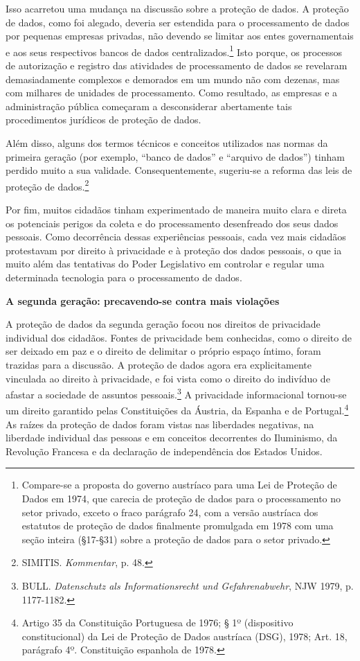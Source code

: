 Isso acarretou uma mudança na discussão sobre a proteção de dados. A
proteção de dados, como foi alegado, deveria ser estendida para o
processamento de dados por pequenas empresas privadas, não devendo se
limitar aos entes governamentais e aos seus respectivos bancos de dados
centralizados.\footnote{Compare-se a proposta do governo austríaco para
  uma Lei de Proteção de Dados em 1974, que carecia de proteção de dados
  para o processamento no setor privado, exceto o fraco parágrafo 24,
  com a versão austríaca dos estatutos de proteção de dados finalmente
  promulgada em 1978 com uma seção inteira (§17-§31) sobre a proteção de
  dados para o setor privado.} Isto porque, os processos de autorização
e registro das atividades de processamento de dados se revelaram
demasiadamente complexos e demorados em um mundo não com dezenas, mas
com milhares de unidades de processamento. Como resultado, as empresas e
a administração pública começaram a desconsiderar abertamente tais
procedimentos jurídicos de proteção de dados.

Além disso, alguns dos termos técnicos e conceitos utilizados nas normas
da primeira geração (por exemplo, ``banco de dados'' e ``arquivo de
dados'') tinham perdido muito a sua validade. Consequentemente,
sugeriu-se a reforma das leis de proteção de dados.\footnote{SIMITIS.
  \emph{Kommentar}, p. 48.}

Por fim, muitos cidadãos tinham experimentado de maneira muito clara e
direta os potenciais perigos da coleta e do processamento desenfreado
dos seus dados pessoais. Como decorrência dessas experiências pessoais,
cada vez mais cidadãos protestavam por direito à privacidade e à
proteção dos dados pessoais, o que ia muito além das tentativas do Poder
Legislativo em controlar e regular uma determinada tecnologia para o
processamento de dados.

\textbf{A segunda geração: precavendo-se contra mais violações}

A proteção de dados da segunda geração focou nos direitos de privacidade
individual dos cidadãos. Fontes de privacidade bem conhecidas, como o
direito de ser deixado em paz e o direito de delimitar o próprio espaço
íntimo, foram trazidas para a discussão. A proteção de dados agora era
explicitamente vinculada ao direito à privacidade, e foi vista como o
direito do indivíduo de afastar a sociedade de assuntos
pessoais.\footnote{BULL. \emph{Datenschutz als Informationsrecht und
  Gefahrenabwehr}, NJW 1979, p. 1177-1182.} A privacidade informacional
tornou-se um direito garantido pelas Constituições da Áustria, da
Espanha e de Portugal.\footnote{Artigo 35 da Constituição Portuguesa de
  1976; § 1º (dispositivo constitucional) da Lei de Proteção de Dados
  austríaca (DSG), 1978; Art. 18, parágrafo 4º. Constituição espanhola
  de 1978.} As raízes da proteção de dados foram vistas nas liberdades
negativas, na liberdade individual das pessoas e em conceitos
decorrentes do Iluminismo, da Revolução Francesa e da declaração de
independência dos Estados Unidos.

